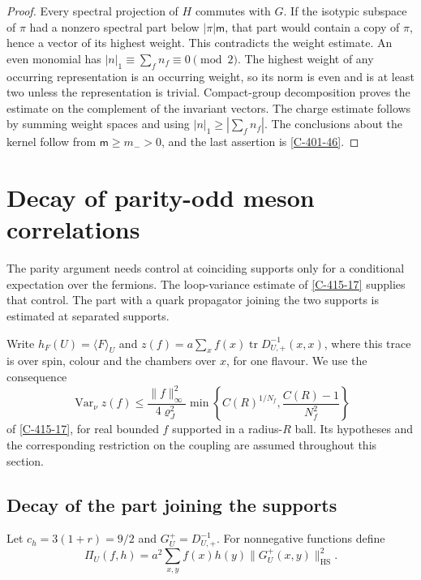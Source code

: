 \documentclass[11pt,letterpaper,reqno]{amsart}
\theoremstyle{definition}
\theoremstyle{remark}
\begin{document}
\begin{proof}
Every spectral projection of $H$ commutes with $G$.
If the isotypic subspace of $\pi$ had a nonzero
spectral part below $|\pi|\mathsf m$, that part
would contain a copy of $\pi$, hence a vector of
its highest weight. This contradicts the weight
estimate. An even monomial has
$|n|_1\equiv\sum_fn_f\equiv0\pmod2$.
The highest weight of any occurring representation
is an occurring weight, so its norm is even and
is at least two unless the representation is
trivial. Compact-group decomposition proves the
estimate on the complement of the invariant
vectors. The charge estimate follows by summing
weight spaces and using $|n|_1\ge|\sum_fn_f|$.
The conclusions about the kernel follow from
$\mathsf m\ge m_->0$, and the last assertion
is \cref{C-401-46}.
\end{proof}

\section{Decay of parity-odd meson correlations}
\label{sec:qcd2-parity}

The parity argument needs control at coinciding
supports only for a conditional expectation over
the fermions. The loop-variance estimate of
\cref{C-415-17} supplies that control. The part
with a quark propagator joining the two supports
is estimated at separated supports.

Write $h_F(U)=\langle F\rangle_U$ and
$z(f)=a\sum_xf(x)\operatorname{tr}D_{U,+}^{-1}(x,x)$,
where this trace is over spin, colour and the chambers
over $x$, for one flavour. We use the consequence
\begin{equation}\label{eq:qcd2-loop-variance-input}
 \operatorname{Var}_\nu z(f)
 \le\frac{\|f\|_\infty^2}{4\varrho_J^2}
       \min\left\{C(R)^{1/N_f},
                         \frac{C(R)-1}{N_f^2}\right\}
\end{equation}
of \cref{C-415-17}, for real bounded $f$ supported
in a radius-$R$ ball. Its hypotheses and the
corresponding restriction on the coupling are
assumed throughout this section.

\subsection{Decay of the part joining the supports}

Let $c_h=3(1+r)=9/2$ and $G_U^+=D_{U,+}^{-1}$.
For nonnegative functions define
\[
 \Pi_U(f,h)=a^2\sum_{x,y}f(x)h(y)
                                    \|G_U^+(x,y)\|_{\mathrm{HS}}^2.
\]
\end{document}
